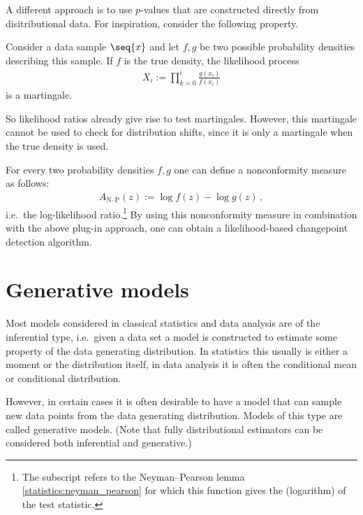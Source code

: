     A different approach is to use $p$-values that are constructed directly from disitributional data. For inspiration, consider the following property.
    \begin{property}
        Consider a data sample $\seq{x}$ and let $f,g$ be two possible probability densities describing this sample. If $f$ is the true density, the likelihood process
        \begin{gather}
            X_i := \prod_{k=0}^i \frac{g(x_i)}{f(x_i)}
        \end{gather}
        is a martingale.
    \end{property}
    So likelihood ratios already give rise to test martingales. However, this martingale cannot be used to check for distribution shifts, since it is only a martingale when the true density is used.
    \begin{example}
        For every two probability densities $f,g$ one can define a nonconformity measure as follows:
        \begin{gather}
            A_{\text{N--P}}(z) := \log f(z)-\log g(z)\,,
        \end{gather}
        i.e.~the log-likelihood ratio.\footnote{The subscript refers to the Neyman--Pearson lemma \ref{statistics:neyman_pearson} for which this function gives the (logarithm) of the test statistic.} By using this nonconformity measure in combination with the above plug-in approach, one can obtain a likelihood-based changepoint detection algorithm.
    \end{example}

\section{Generative models}

    Most models considered in classical statistics and data analysis are of the inferential type, i.e.~given a data set a model is constructed to estimate some property of the data generating distribution. In statistics this usually is either a moment or the distribution itself, in data analysis it is often the conditional mean or conditional distribution.

    However, in certain cases it is often desirable to have a model that can sample new data points from the data generating distribution. Models of this type are called generative models. (Note that fully distributional estimators can be considered both inferential and generative.)

